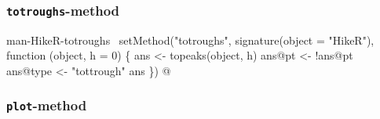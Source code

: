 \documentclass[a4paper]{article}
\begin{document}
\subsubsection{\texttt{totroughs}-method}

\nwenddocs{}\endmoddef
\LA{}man-HikeR-totroughs~{\nwtagstyle{}}\RA{}
setMethod("totroughs",
    signature(object = "HikeR"),
    function (object, h = 0) \{
        ans <- topeaks(object, h)
        ans@pt <- !ans@pt
        ans@type <- "tottrough"
        ans
\})
\nwendcode{}@

\subsubsection{\texttt{plot}-method}
\end{document}
